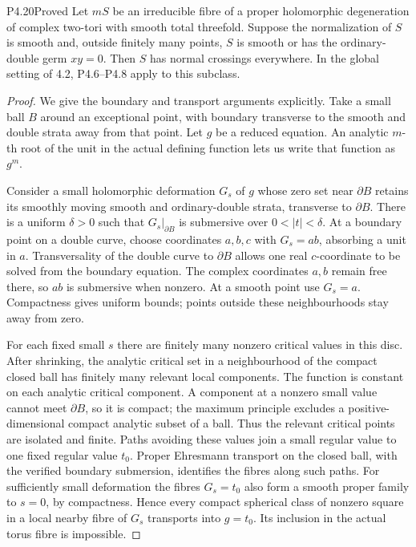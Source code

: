\begin{statement}{P4.20}{Proved}
Let $mS$ be an irreducible fibre of a proper holomorphic
degeneration of complex two-tori with smooth total threefold.
Suppose the normalization of $S$ is smooth and, outside
finitely many points, $S$ is smooth or has the ordinary-double
germ $xy=0$. Then $S$ has normal crossings everywhere.
In the global setting of 4.2, P4.6--P4.8 apply to this subclass.
\end{statement}
\begin{proof}
We give the boundary and transport arguments explicitly.
Take a small ball $B$ around an exceptional point, with
boundary transverse to the smooth and double strata away
from that point. Let $g$ be a reduced equation. An analytic
$m$-th root of the unit in the actual defining function lets
us write that function as $g^m$.

Consider a small holomorphic deformation $G_s$ of $g$ whose
zero set near $\partial B$ retains its smoothly moving smooth
and ordinary-double strata, transverse to $\partial B$.
There is a uniform $\delta>0$ such that
$G_s|_{\partial B}$ is submersive over $0<|t|<\delta$.
At a boundary point on a double curve, choose coordinates
$a,b,c$ with $G_s=ab$, absorbing a unit in $a$.
Transversality of the double curve to $\partial B$ allows one
real $c$-coordinate to be solved from the boundary equation.
The complex coordinates $a,b$ remain free there, so $ab$ is
submersive when nonzero. At a smooth point use $G_s=a$.
Compactness gives uniform bounds; points outside these
neighbourhoods stay away from zero.

For each fixed small $s$ there are finitely many nonzero
critical values in this disc. After shrinking, the analytic
critical set in a neighbourhood of the compact closed ball
has finitely many relevant local components. The function is constant on
each analytic critical component. A component at a nonzero
small value cannot meet $\partial B$, so it is compact;
the maximum principle excludes a positive-dimensional
compact analytic subset of a ball. Thus the relevant critical
points are isolated and finite. Paths avoiding these values
join a small regular value to one fixed regular value $t_0$.
Proper Ehresmann transport on the closed ball, with the
verified boundary submersion, identifies the fibres along
such paths. For sufficiently small deformation the fibres
$G_s=t_0$ also form a smooth proper family to $s=0$, by
compactness. Hence every compact spherical class of nonzero
square in a local nearby fibre of $G_s$ transports into
$g=t_0$. Its inclusion in the actual torus fibre is impossible.


\end{proof}
